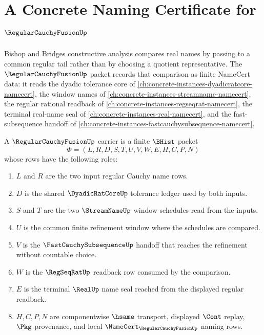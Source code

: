 \chapter{A Concrete Naming Certificate for $\RegularCauchyFusionUp$}
\label{ch:concrete-instances-regular-cauchy-fusion-namecert}

Bishop and Bridges constructive analysis compares real names by passing to a common regular tail rather than by choosing a quotient representative. The $\RegularCauchyFusionUp$ packet records that comparison as finite NameCert data: it reads the dyadic tolerance core of \autoref{ch:concrete-instances-dyadicratcore-namecert}, the window names of \autoref{ch:concrete-instances-streamname-namecert}, the regular rational readback of \autoref{ch:concrete-instances-regseqrat-namecert}, the terminal real-name seal of \autoref{ch:concrete-instances-real-namecert}, and the fast-subsequence handoff of \autoref{ch:concrete-instances-fastcauchysubsequence-namecert}.

\begin{definition}
\label{def:regular-cauchy-fusion-carrier}
A $\RegularCauchyFusionUp$ carrier is a finite $\BHist$ packet
$$
\Phi=(L,R,D,S,T,U,V,W,E,H,C,P,N)
$$
whose rows have the following roles:
\begin{enumerate}
\item $L$ and $R$ are the two input regular Cauchy name rows.
\item $D$ is the shared $\DyadicRatCoreUp$ tolerance ledger used by both inputs.
\item $S$ and $T$ are the two $\StreamNameUp$ window schedules read from the inputs.
\item $U$ is the common finite refinement window where the schedules are compared.
\item $V$ is the $\FastCauchySubsequenceUp$ handoff that reaches the refinement without countable choice.
\item $W$ is the $\RegSeqRatUp$ readback row consumed by the comparison.
\item $E$ is the terminal $\RealUp$ name seal reached from the displayed regular readback.
\item $H,C,P,N$ are componentwise $\hsame$ transport, displayed $\Cont$ replay, $\Pkg$ provenance, and local $\NameCert_{\RegularCauchyFusionUp}$ naming rows.
\end{enumerate}
\end{definition}


